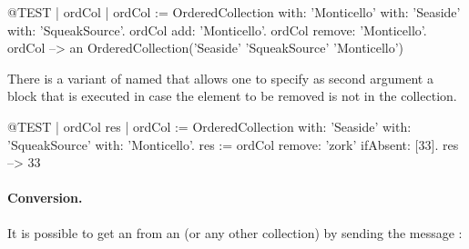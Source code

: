 \documentclass[a4paper,10pt,twoside]{book}
\begin{document}
\begin{code}{@TEST | ordCol | ordCol := OrderedCollection with: 'Monticello' with: 'Seaside' with: 'SqueakSource'.}
ordCol add: 'Monticello'.
ordCol remove: 'Monticello'.
ordCol --> an OrderedCollection('Seaside' 'SqueakSource' 'Monticello')
\end{code}

There is a variant of  named  that allows one to specify 
as second argument a block that is executed in case the element to be removed is not in the collection. 

\begin{code}{@TEST | ordCol res | ordCol := OrderedCollection with: 'Seaside' with: 'SqueakSource' with: 'Monticello'.}
res := ordCol remove: 'zork' ifAbsent: [33].
res --> 33
\end{code}

\paragraph{Conversion.}
It is possible to get an  from an  (or any other collection) by sending the message :




\end{document}
